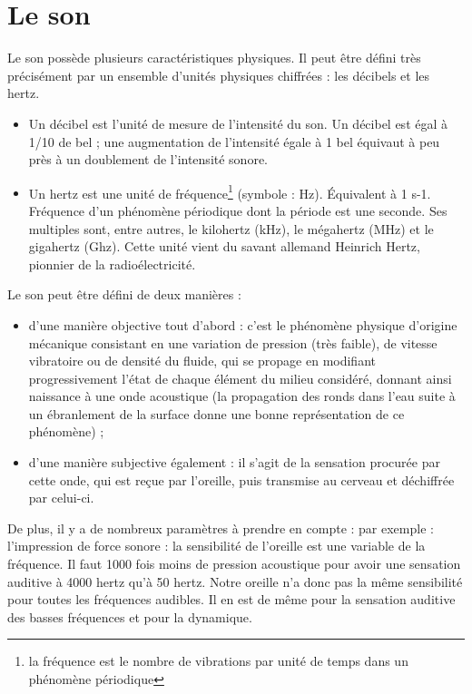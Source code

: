 \section{Le son}

Le son possède plusieurs caractéristiques physiques. Il peut être
défini très précisément par un ensemble d'unités physiques chiffrées
: les décibels et les hertz. 
\begin{itemize}
	\item Un décibel est l'unité de mesure de l'intensité du son. Un décibel
	est égal à 1/10 de bel ; une augmentation de l'intensité égale à 1
	bel équivaut à peu près à un doublement de l'intensité sonore. 
	\item Un hertz est une unité de fréquence\footnote{la fréquence est le nombre de vibrations par unité de temps dans un
		phénomène périodique} (symbole : Hz). Équivalent à 1 s-1. Fréquence d'un phénomène périodique
	dont la période est une seconde. Ses multiples sont, entre autres,
	le kilohertz (kHz), le mégahertz (MHz) et le gigahertz (Ghz). Cette
	unité vient du savant allemand Heinrich Hertz, pionnier de la radioélectricité.
\end{itemize}
Le son peut être défini de deux manières : 
\begin{itemize}
	\item d'une manière objective tout d'abord : c'est le phénomène physique
	d'origine mécanique consistant en une variation de pression (très
	faible), de vitesse vibratoire ou de densité du fluide, qui se propage
	en modifiant progressivement l'état de chaque élément du milieu considéré,
	donnant ainsi naissance à une onde acoustique (la propagation des
	ronds dans l'eau suite à un ébranlement de la surface donne une bonne
	représentation de ce phénomène) ; 
	\item d'une manière subjective également : il s'agit de la sensation procurée
	par cette onde, qui est reçue par l'oreille, puis transmise au cerveau
	et déchiffrée par celui-ci.
\end{itemize}
De plus, il y a de nombreux paramètres à prendre en compte : par
exemple : l'impression de force sonore : la sensibilité de l'oreille
est une variable de la fréquence. Il faut 1000 fois moins de pression
acoustique pour avoir une sensation auditive à 4000 hertz qu'à 50
hertz. Notre oreille n'a donc pas la même sensibilité pour toutes
les fréquences audibles. Il en est de même pour la sensation auditive
des basses fréquences et pour la dynamique. 





